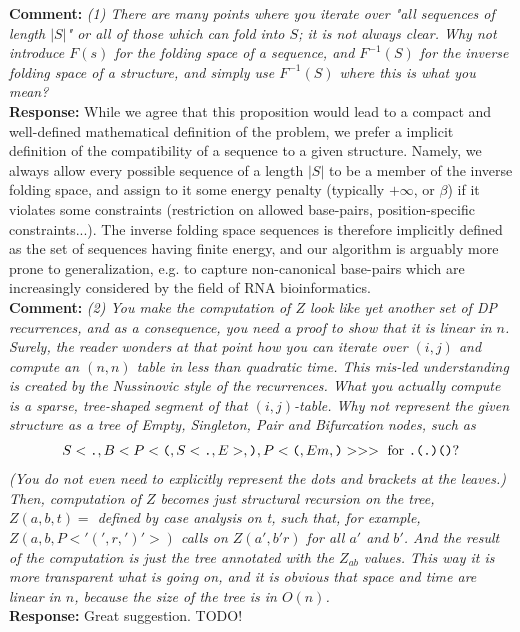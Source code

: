 \documentclass[11pt,hyperref,draft]{article} %
\newcommand{\Answer}[1]{\noindent\textsf{\textbf{Response: }}{\sf#1}\\}
\newcommand{\Comment}[1]{\noindent\textsf{\textbf{Comment: }}{\it#1}\\[.5em]}
\begin{document}
\Comment{(1) There are many points where you iterate over "all sequences of length $|S|$" or all of those which can fold into $S$; it is not always clear. Why not introduce $F(s)$ for the folding space of a sequence, and $F^{-1}(S)$ for the inverse folding space of a structure, and simply use $F^{-1}(S)$ where this is what you mean?}
\Answer{While we agree that this proposition would lead to a compact and well-defined mathematical definition of the problem, we prefer a implicit definition of the compatibility of a sequence to a given structure. Namely, we always allow every possible sequence of a length $|S|$ to be a member of the inverse folding space, and assign to it some  energy penalty (typically $+\infty$, or $\beta$) if it violates some constraints (restriction on allowed base-pairs, position-specific constraints...). The inverse folding space sequences is therefore implicitly defined as the set of sequences having finite energy, and our algorithm is arguably more prone to generalization, e.g. to capture non-canonical base-pairs which are increasingly considered by the field of RNA bioinformatics.
}

\Comment{(2) You make the computation of $Z$ look like yet another set of DP recurrences, and as a consequence, you need a proof to show that it is linear in $n$. Surely, the reader wonders at that point how you can iterate over $(i,j)$ and compute an $(n,n)$ table in less than quadratic time. This mis-led understanding is created by the Nussinovic style of the recurrences.
 What you actually compute is a sparse, tree-shaped segment of that $(i,j)$-table.
 Why not represent the given structure as a tree of Empty, Singleton, Pair and Bifurcation nodes, such as 
\begin{align*}
  S<\texttt{.},B<P<\texttt{(},S<\texttt{.},E>,\texttt{)},P<\texttt{(},Em,\texttt{)}>>> \text{ for {\tt .(.)()}}  ? 
\end{align*}
 (You do not even need to explicitly represent the dots and brackets at the leaves.)\\
 Then, computation of $Z$ becomes just structural recursion on the tree,
     $Z(a,b, t) =$ defined by case analysis on t, such that, for example,
     $Z(a,b,P<'(',r,')'>)$ calls on $Z(a',b' r)$ for all $a'$ and $b'$.
And the result of the computation is just the tree annotated with the $Z_{ab}$ values. 
This way it is more transparent what is going on, and it is obvious that space and time are linear in $n$, because the size of the tree is in $O(n)$.}
\Answer{Great suggestion. TODO!}
\end{document}
